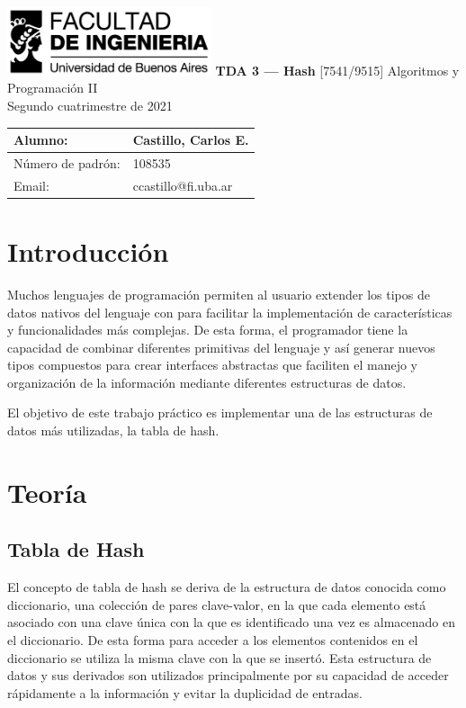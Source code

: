 \documentclass[titlepage,a4paper]{article}
\makeatletter
\newcommand{\FirstName}{Carlos E.}
\newcommand{\LastName}{Castillo}
\newcommand{\StudentID}{108535}
\newcommand{\StudentEmail}{ccastillo@fi.uba.ar}
\newcommand{\ProjectName}{TDA 3 — Hash}
\makeatother
\begin{document}
\begin{titlepage}
	\hfill\includegraphics[width=6cm]{logofiuba.jpg}
    \centering
    \vfill
    \Huge \textbf{\ProjectName}
    \vskip2cm
    \Large [7541/9515] Algoritmos y Programación II\\
    Segundo cuatrimestre de 2021 
    \vfill
    \begin{tabular}{ | l | l | }
      \hline
      Alumno: & \LastName, \FirstName \\ \hline
      Número de padrón: & \StudentID \\ \hline
      Email: & \StudentEmail \\ \hline
  	\end{tabular}
    \vfill
    \vfill
\end{titlepage}

\tableofcontents
\newpage



\section{Introducción}\label{sec:intro}

Muchos lenguajes de programación permiten al usuario extender los tipos de datos
nativos del lenguaje con para facilitar la implementación de características y
funcionalidades más complejas. De esta forma, el programador tiene la capacidad
de combinar diferentes primitivas del lenguaje y así generar nuevos tipos
compuestos para crear interfaces abstractas que faciliten el manejo y
organización de la información mediante diferentes estructuras de datos.

El objetivo de este trabajo práctico es implementar una de las estructuras de
datos más utilizadas, la tabla de hash. 



\section{Teoría}\label{sec:teoria}
\subsection{Tabla de Hash}
El concepto de tabla de hash se deriva de la estructura de datos conocida como
diccionario, una colección de pares clave-valor, en la que cada elemento está
asociado con una clave única con la que es identificado una vez es almacenado en
el diccionario. De esta forma para acceder a los elementos contenidos en el
diccionario se utiliza la misma clave con la que se insertó. Esta estructura de
datos y sus derivados son utilizados principalmente por su capacidad de acceder
rápidamente a la información y evitar la duplicidad de entradas.
\end{document}
